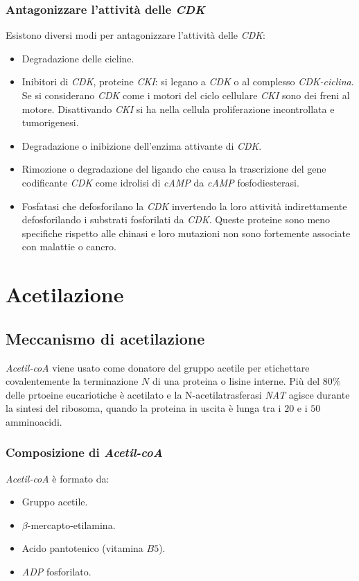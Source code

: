 		\subsubsection{Antagonizzare l'attivit\`a delle \emph{CDK}}
		Esistono diversi modi per antagonizzare l'attivit\`a delle \emph{CDK}:
		\begin{itemize}
			\item Degradazione delle cicline.
			\item Inibitori di \emph{CDK}, proteine \emph{CKI}: si legano a \emph{CDK} o al complesso \emph{CDK-ciclina}. 
				Se si considerano \emph{CDK} come i motori del ciclo cellulare \emph{CKI} sono dei freni al motore.
				Disattivando \emph{CKI} si ha nella cellula proliferazione incontrollata e tumorigenesi.
			\item Degradazione o inibizione dell'enzima attivante di \emph{CDK}.
			\item Rimozione o degradazione del ligando che causa la trascrizione del gene codificante \emph{CDK} come idrolisi di \emph{cAMP} da \emph{cAMP} fosfodiesterasi.
			\item Fosfatasi che defosforilano la \emph{CDK} invertendo la loro attivit\`a indirettamente defosforilando i substrati fosforilati da \emph{CDK}. 
				Queste proteine sono meno specifiche rispetto alle chinasi e loro mutazioni non sono fortemente associate con malattie o cancro. 
		\end{itemize}

\section{Acetilazione}

	\subsection{Meccanismo di acetilazione}
	\emph{Acetil-coA} viene usato come donatore del gruppo acetile per etichettare covalentemente la terminazione $N$ di una proteina o lisine interne. 
	Pi\`u del $80\%$ delle prtoeine eucariotiche \`e acetilato e la N-acetilatrasferasi \emph{NAT} agisce durante la sintesi del ribosoma, quando la proteina in uscita \`e lunga tra i $20$ e i $50$
	amminoacidi. 

		\subsubsection{Composizione di \emph{Acetil-coA}}
		\emph{Acetil-coA} \`e formato da:
		\begin{multicols}{2}
			\begin{itemize}
				\item Gruppo acetile.
				\item $\beta$-mercapto-etilamina.
				\item Acido pantotenico (vitamina $B5$).
				\item \emph{ADP} fosforilato. 
			\end{itemize}
		\end{multicols}
		

